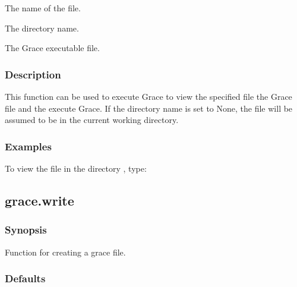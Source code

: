   The name of the file.   

   The directory name.   

   The Grace executable file.  

  

  
 \subsubsection{Description} 

 This function can be used to execute Grace to view the specified file the Grace  file and the execute Grace. If the directory name is set to None, the file will be assumed to be in the current working directory. 
  

  
 \subsubsection{Examples} 

 To view the file  in the directory , type: 
  



  

 \newpage 

 \subsection{grace.write} 

  
 \subsubsection{Synopsis} 

 Function for creating a grace  file. 
  

  
 \subsubsection{Defaults} 

